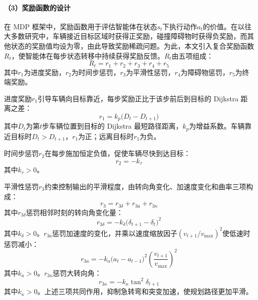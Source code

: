 \documentclass{iopjournal}
\begin{document}
\paragraph{（3）奖励函数的设计}

在 MDP 框架中，奖励函数用于评估智能体在状态$s_t$下执行动作$a_t$的价值。在以往大多数研究中，车辆接近目标区域时获得正奖励，碰撞障碍物时获得负奖励，而其他状态的奖励值均设为零，由此导致奖励稀疏问题。为此，本文引入复合奖励函数$R_t$，使智能体在每步状态转移中持续获得奖励反馈。$R_t$由五项组成：
\begin{equation}\label{eq:reward_total}
  R_t = r_1 + r_2 + r_3 + r_4 + r_5
\end{equation}
其中$r_1$为进度奖励，$r_2$为时间步惩罚，$r_3$为平滑性惩罚，$r_4$为障碍物惩罚，$r_5$为终端奖励。

进度奖励$r_1$引导车辆向目标靠近，每步奖励正比于该步前后到目标的 Dijkstra 距离之差：
\begin{equation}\label{eq:reward_prog}
  r_1 = k_p \bigl(D_t - D_{t+1}\bigr)
\end{equation}
其中$D_t$为第$t$步车辆位置到目标的 Dijkstra 最短路径距离，$k_p$为增益系数。车辆靠近目标时$D_t > D_{t+1}$，$r_1$为正；远离目标时$r_1$为负。

时间步惩罚$r_2$在每步施加恒定负值，促使车辆尽快到达目标：
\begin{equation}\label{eq:reward_time}
  r_2 = -k_\tau
\end{equation}
其中$k_\tau > 0$。

平滑性惩罚$r_3$约束控制输出的平滑程度，由转向角变化、加速度变化和曲率三项构成：
\begin{equation}\label{eq:reward_smooth}
  r_3 = r_{3\delta} + r_{3a} + r_{3\kappa}
\end{equation}
其中$r_{3\delta}$惩罚相邻时刻的转向角变化量：
\begin{equation}\label{eq:reward_steer}
  r_{3\delta} = -k_\delta\bigl(\delta_{t+1}-\delta_t\bigr)^2
\end{equation}
其中$k_\delta > 0$。$r_{3a}$惩罚加速度的变化，并乘以速度缩放因子$(v_{t+1}/v_{\max})^2$使低速时惩罚减小：
\begin{equation}\label{eq:reward_acc}
  r_{3a} = -k_a\bigl(a_t - a_{t-1}\bigr)^2\!\left(\frac{v_{t+1}}{v_{\max}}\right)^{\!2}
\end{equation}
其中$k_a > 0$。$r_{3\kappa}$惩罚大转向角：
\begin{equation}\label{eq:reward_curv}
  r_{3\kappa} = -k_\kappa \tan^2\!\delta_{t+1}
\end{equation}
其中$k_\kappa > 0$。上述三项共同作用，抑制急转弯和突变加速，使规划路径更加平滑。
\end{document}
